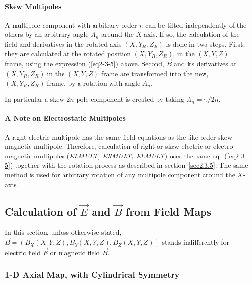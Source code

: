 \paragraph{Skew Multipoles}

\noindent A multipole component with arbitrary order $n$ can be tilted independently of 
the others by an arbitrary 
angle $A_n$ around the $X$-axis. If so, the calculation of the field and derivatives in the 
rotated axis $ (X,Y_R,Z_R) $ is done in two steps. First, they are 
calculated at the rotated position $ (X,Y_R,Z_R)$,  in the $ (X,Y,Z) $ 
frame, using the  expression (\ref{eq2-3-5}) above. Second, $ \vec  B $ and 
its derivatives at $ (X,Y_R,Z_R) $ in the $ (X,Y,Z) $ frame are transformed 
into the new,  $ (X,Y_R,Z_R) $ frame,  by a rotation with angle  $A_n$. 

In particular a skew $2n$-pole component is created  by taking $A_n = \pi/2n$.




\paragraph{A Note on Electrostatic Multipoles}

\noindent A right electric multipole has the same field equations 
as the like-order skew magnetic multipole. Therefore, 
calculation of  right or skew electric or electro-magnetic multipoles 
(\textsl{ELMULT, EBMULT, ELMULT})   uses the 
same eq.~(\ref{eq2-3-5}) together with the rotation process as described in 
section~\ref{sec2.3.5}. The same method is used  for arbitrary rotation of 
any multipole component around the $ X $-axis. 





\subsection{Calculation of   $ \vec E$ and $ \vec B $ from Field Maps}  \label{seq2.4}

\noindent In this section, unless otherwise stated, $ \vec  B = (B_X(X,Y,Z),B_Y(X,Y,Z),B_Z(X,Y,Z)) $ stands 
indifferently for electric field $\vec E$  or magnetic field $\vec B$. 


\subsubsection{1-D Axial Map, with Cylindrical Symmetry}  \label{sec2.4.1}


